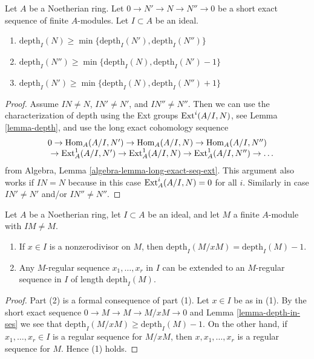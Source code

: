 \begin{lemma}
\label{lemma-depth-in-ses}
Let $A$ be a Noetherian ring. Let $0 \to N' \to N \to N'' \to 0$
be a short exact sequence of finite $A$-modules.
Let $I \subset A$ be an ideal.
\begin{enumerate}
\item
$\text{depth}_I(N) \geq \min\{\text{depth}_I(N'), \text{depth}_I(N'')\}$
\item
$\text{depth}_I(N'') \geq \min\{\text{depth}_I(N), \text{depth}_I(N') - 1\}$
\item
$\text{depth}_I(N') \geq \min\{\text{depth}_I(N), \text{depth}_I(N'') + 1\}$
\end{enumerate}
\end{lemma}

\begin{proof}
Assume $IN \not = N$, $IN' \not = N'$, and $IN'' \not = N''$. Then we
can use the characterization of depth using the Ext groups
$\mathop{\mathrm{Ext}}\nolimits^i(A/I, N)$, see Lemma \ref{lemma-depth},
and use the long exact cohomology sequence
$$
\begin{matrix}
0
\to \mathop{\mathrm{Hom}}\nolimits_A(A/I, N')
\to \mathop{\mathrm{Hom}}\nolimits_A(A/I, N)
\to \mathop{\mathrm{Hom}}\nolimits_A(A/I, N'')
\\
\phantom{0\ }
\to \mathop{\mathrm{Ext}}\nolimits^1_A(A/I, N')
\to \mathop{\mathrm{Ext}}\nolimits^1_A(A/I, N)
\to \mathop{\mathrm{Ext}}\nolimits^1_A(A/I, N'')
\to \ldots
\end{matrix}
$$
from Algebra, Lemma \ref{algebra-lemma-long-exact-seq-ext}.
This argument also works if $IN = N$
because in this case $\mathop{\mathrm{Ext}}\nolimits^i_A(A/I, N) = 0$ for all $i$.
Similarly in case $IN' \not = N'$ and/or $IN'' \not = N''$.
\end{proof}

\begin{lemma}
\label{lemma-depth-drops-by-one}
Let $A$ be a Noetherian ring, let $I \subset A$ be an ideal, and
let $M$ a finite $A$-module with $IM \not = M$.
\begin{enumerate}
\item If $x \in I$ is a nonzerodivisor on $M$, then
$\text{depth}_I(M/xM) = \text{depth}_I(M) - 1$.
\item Any $M$-regular sequence $x_1, \ldots, x_r$ in $I$ can be extended to an
$M$-regular sequence in $I$ of length $\text{depth}_I(M)$.
\end{enumerate}
\end{lemma}

\begin{proof}
Part (2) is a formal consequence of part (1). Let $x \in I$ be as in (1).
By the short exact sequence $0 \to M \to M \to M/xM \to 0$ and
Lemma \ref{lemma-depth-in-ses} we see that
$\text{depth}_I(M/xM) \geq \text{depth}_I(M) - 1$.
On the other hand, if $x_1, \ldots, x_r \in I$
is a regular sequence for $M/xM$, then $x, x_1, \ldots, x_r$
is a regular sequence for $M$. Hence (1) holds.
\end{proof}

